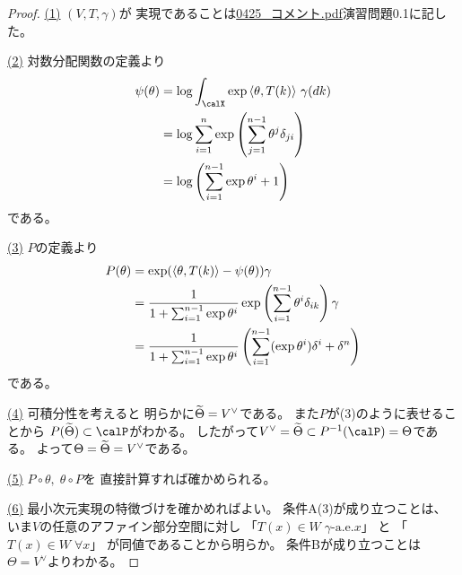 \documentclass[report]{jlreq}
\begin{document}
\begin{proof}
    \uline{(1)} \quad
    $(V, T, \gamma)$が
    実現であることは\url{0425_コメント.pdf}演習問題0.1に記した。

    \uline{(2)} \quad
    対数分配関数の定義より
    \begin{alignat}{1}
        \psi(\theta)
            &=
                \log \int_\calX
                    \exp \myangle{\theta}{T(k)}
                    \, \gamma(dk)
                \\
            &=
                \log \sum_{i = 1}^n
                    \exp \myparen{
                        \sum_{j = 1}^{n - 1}
                            \theta^j
                            \delta_{ji}
                    }
                \\
            &=
                \log \myparen{
                    \sum_{i = 1}^{n - 1}
                        \exp \theta^i
                    + 1
                }
    \end{alignat}
    である。

    \uline{(3)} \quad
    $P$の定義より
    \begin{alignat}{1}
        P(\theta)
            &=
                \exp(\left\langle{\theta},{T(k)}\right\rangle - \psi(\theta)) \gamma
                \\
            &=
                \frac{
                    1
                }{
                    1 + \sum_{i = 1}^{n - 1} \exp\theta^i
                }
                \exp \left({
                    \sum_{i = 1}^{n - 1}
                        \theta^i
                        \delta_{ik}
                }\right)
                \gamma
                \\
            &=
                \frac{
                    1
                }{
                    1 + \sum_{i = 1}^{n - 1} \exp\theta^i
                }
                \left({
                    \sum_{i = 1}^{n - 1}
                        (\exp\theta^i)
                        \delta^i
                        +
                        \delta^n
                }\right)
    \end{alignat}
    である。

    \uline{(4)} \quad
    可積分性を考えると
    明らかに$\widetilde{\Theta} = V^\vee$である。
    また$P$が(3)のように表せることから
    $P(\wt{\Theta}) \subset \calP$がわかる。
    したがって$V^\vee = \wt{\Theta} \subset P^{-1}(\calP) = \Theta$である。
    よって$\Theta = \widetilde{\Theta} = V^\vee$である。

    \uline{(5)} \quad
    $P \circ \theta, \; \theta \circ P$を
    直接計算すれば確かめられる。

    \uline{(6)} \quad
    最小次元実現の特徴づけを確かめればよい。
    条件A(3)が成り立つことは、
    いま$V$の任意のアファイン部分空間に対し
    「$T(x) \in W \; \text{$\gamma$-a.e.$x$}$」
    と
    「$T(x) \in W \; \text{$\forall x$}$」
    が同値であることから明らか。
    条件Bが成り立つことは
    $\Theta = V^\vee$よりわかる。
\end{proof}
\end{document}
